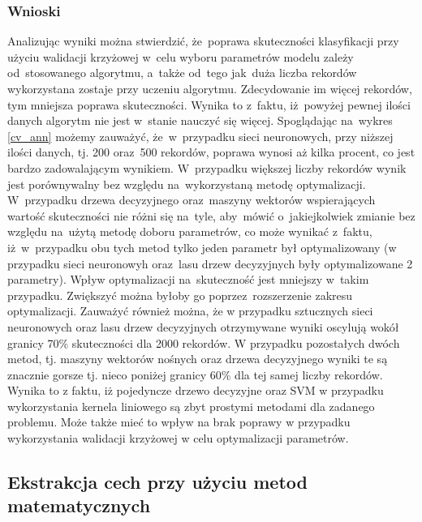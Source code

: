 \subsubsection{Wnioski}
Analizując wyniki można stwierdzić, że~poprawa skuteczności klasyfikacji przy użyciu walidacji krzyżowej w~celu wyboru parametrów modelu zależy od~stosowanego algorytmu, a~także od~tego jak~duża liczba rekordów wykorzystana zostaje przy uczeniu algorytmu. Zdecydowanie im więcej rekordów, tym mniejsza poprawa skuteczności. Wynika to z~faktu, iż~powyżej pewnej ilości danych algorytm nie jest w~stanie nauczyć się więcej. Spoglądając na~wykres \ref{cv_ann} możemy zauważyć, że~w~przypadku sieci neuronowych, przy niższej ilości danych, tj. 200 oraz~500 rekordów, poprawa wynosi aż kilka procent, co jest bardzo zadowalającym wynikiem. W~przypadku większej liczby rekordów wynik jest porównywalny bez względu na~wykorzystaną metodę optymalizacji. W~przypadku drzewa decyzyjnego oraz~maszyny wektorów wspierających wartość skuteczności nie różni się na~tyle, aby~mówić o~jakiejkolwiek zmianie bez względu na~użytą metodę doboru parametrów, co może wynikać z~faktu, iż~w~przypadku obu tych metod tylko jeden parametr był optymalizowany (w przypadku sieci neuronowyh oraz~lasu drzew decyzyjnych były optymalizowane 2 parametry). Wpływ optymalizacji na~skuteczność jest mniejszy w~takim przypadku. Zwiększyć można byłoby go poprzez~rozszerzenie zakresu optymalizacji. Zauważyć również można, że w przypadku sztucznych sieci neuronowych oraz lasu drzew decyzyjnych otrzymywane wyniki oscylują wokół granicy 70\% skuteczności dla 2000 rekordów. W przypadku pozostałych dwóch metod, tj. maszyny wektorów nośnych oraz drzewa decyzyjnego wyniki te są znacznie gorsze tj. nieco poniżej granicy 60\% dla tej samej liczby rekordów. Wynika to z faktu, iż pojedyncze drzewo decyzyjne oraz SVM w przypadku wykorzystania kernela liniowego są zbyt prostymi metodami dla zadanego problemu. Może także mieć to wpływ na brak poprawy w przypadku wykorzystania walidacji krzyżowej w celu optymalizacji parametrów. 

\subsection{Ekstrakcja cech przy użyciu metod matematycznych}

